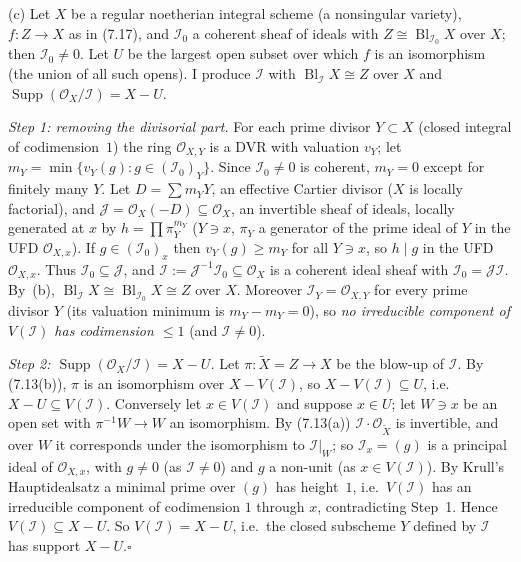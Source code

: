 \documentclass[11pt]{article}
\begin{document}
(c) Let $X$ be a regular noetherian integral scheme (a nonsingular variety), $f:Z\to X$ as in (7.17), and $\mathcal I_0$ a coherent sheaf of ideals with $Z\cong\operatorname{Bl}_{\mathcal I_0}X$ over $X$; then $\mathcal I_0\ne0$. Let $U$ be the largest open subset over which $f$ is an isomorphism (the union of all such opens). I produce $\mathcal I$ with $\operatorname{Bl}_{\mathcal I}X\cong Z$ over $X$ and $\operatorname{Supp}(\mathcal O_X/\mathcal I)=X-U$.

\emph{Step 1: removing the divisorial part.} For each prime divisor $Y\subset X$ (closed integral of codimension~$1$) the ring $\mathcal O_{X,Y}$ is a DVR with valuation $v_Y$; let $m_Y=\min\{v_Y(g):g\in(\mathcal I_0)_Y\}$. Since $\mathcal I_0\ne0$ is coherent, $m_Y=0$ except for finitely many $Y$. Let $D=\sum m_YY$, an effective Cartier divisor ($X$ is locally factorial), and $\mathcal J=\mathcal O_X(-D)\subseteq\mathcal O_X$, an invertible sheaf of ideals, locally generated at $x$ by $h=\prod\pi_Y^{m_Y}$ ($Y\ni x$, $\pi_Y$ a generator of the prime ideal of $Y$ in the UFD $\mathcal O_{X,x}$). If $g\in(\mathcal I_0)_x$ then $v_Y(g)\ge m_Y$ for all $Y\ni x$, so $h\mid g$ in the UFD $\mathcal O_{X,x}$. Thus $\mathcal I_0\subseteq\mathcal J$, and $\mathcal I:=\mathcal J^{-1}\mathcal I_0\subseteq\mathcal O_X$ is a coherent ideal sheaf with $\mathcal I_0=\mathcal J\mathcal I$. By~(b), $\operatorname{Bl}_{\mathcal I}X\cong\operatorname{Bl}_{\mathcal I_0}X\cong Z$ over $X$. Moreover $\mathcal I_Y=\mathcal O_{X,Y}$ for every prime divisor $Y$ (its valuation minimum is $m_Y-m_Y=0$), so \emph{no irreducible component of $V(\mathcal I)$ has codimension $\le1$} (and $\mathcal I\ne0$).

\emph{Step 2: $\operatorname{Supp}(\mathcal O_X/\mathcal I)=X-U$.} Let $\pi:\tilde X=Z\to X$ be the blow-up of $\mathcal I$. By (7.13(b)), $\pi$ is an isomorphism over $X-V(\mathcal I)$, so $X-V(\mathcal I)\subseteq U$, i.e.\ $X-U\subseteq V(\mathcal I)$. Conversely let $x\in V(\mathcal I)$ and suppose $x\in U$; let $W\ni x$ be an open set with $\pi^{-1}W\to W$ an isomorphism. By (7.13(a)) $\mathcal I\cdot\mathcal O_{\tilde X}$ is invertible, and over $W$ it corresponds under the isomorphism to $\mathcal I|_W$; so $\mathcal I_x=(g)$ is a principal ideal of $\mathcal O_{X,x}$, with $g\neq0$ (as $\mathcal I\ne0$) and $g$ a non-unit (as $x\in V(\mathcal I)$). By Krull's Hauptidealsatz a minimal prime over $(g)$ has height~$1$, i.e.\ $V(\mathcal I)$ has an irreducible component of codimension $1$ through $x$, contradicting Step~1. Hence $V(\mathcal I)\subseteq X-U$. So $V(\mathcal I)=X-U$, i.e.\ the closed subscheme $Y$ defined by $\mathcal I$ has support $X-U$.\hfill$\square$
\end{document}
